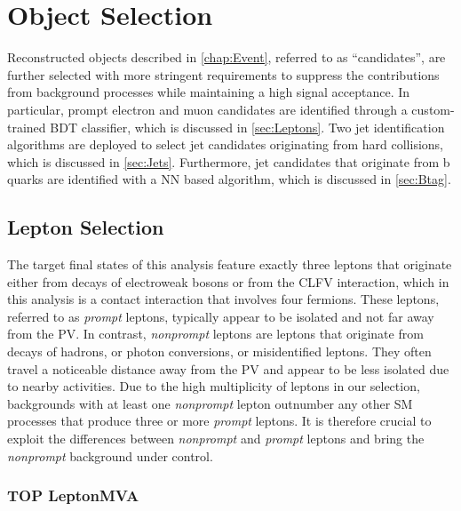 \chapter{Object Selection}
\label{chap:Objects}

Reconstructed objects described in \autoref{chap:Event}, referred to as ``candidates'', are further selected with more stringent requirements to suppress the contributions from background processes while maintaining a high signal acceptance. In particular, prompt electron and muon candidates are identified through a custom-trained \ac{BDT} classifier, which is discussed in \autoref{sec:Leptons}. Two jet identification algorithms are deployed to select jet candidates originating from hard collisions, which is discussed in \autoref{sec:Jets}. Furthermore, jet candidates that originate from b quarks are identified with a \ac{NN} based algorithm, which is discussed in \autoref{sec:Btag}. 
\section{Lepton Selection}
\label{sec:Leptons}

The target final states of this analysis feature exactly three leptons that originate either from decays of electroweak bosons or from the \ac{CLFV} interaction, which in this analysis is a contact interaction that involves four fermions. These leptons, referred to as \emph{prompt} leptons, typically appear to be isolated and not far away from the \ac{PV}. In contrast, \emph{nonprompt} leptons are leptons that originate from decays of hadrons, or photon conversions, or misidentified leptons. They often travel a noticeable distance away from the \ac{PV} and appear to be less isolated due to nearby activities. Due to the high multiplicity of leptons in our selection, backgrounds with at least one \emph{nonprompt} lepton outnumber any other \ac{SM} processes that produce three or more \emph{prompt} leptons. It is therefore crucial to exploit the differences between \emph{nonprompt} and \emph{prompt} leptons and bring the \emph{nonprompt} background under control. 
\subsection{TOP LeptonMVA}
\label{subsec:TOPMVA}

